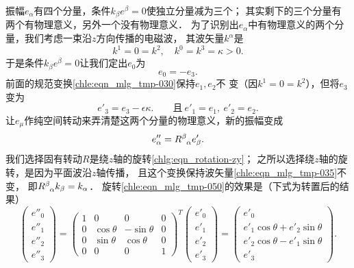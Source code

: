 振幅$e_\alpha$有四个分量，条件$k_\beta e^\beta =0$使独立分量减为三个；
其实剩下的三个分量有两个有物理意义，另外一个没有物理意义．
为了识别出$e_\alpha$中有物理意义的两个分量，我们考虑一束沿$z$方向传播的电磁波，
其波矢量$k^\alpha$是
\begin{equation}\label{chle:eqn_mlg_tmp-035}
    k^1 = 0= k^2 , \quad k^0=k^3=\kappa >0.
\end{equation}
于是条件$k_\beta e^\beta =0$让我们定出$e_0$为
\begin{equation}\label{chle:eqn_mlg_tmp-040}
    e_0 = - e_3.
\end{equation}
前面的规范变换\eqref{chle:eqn_mlg_tmp-030}保持$e_1,e_2$不
变（因$k^1 = 0= k^2$），但将$e_3$变为
\begin{equation}\label{chle:eqn_mlg_tmp-045}
    e'_3 =  e_3 - \epsilon \kappa. \qquad
     \text{且} \  e'_1 =  e_1, \  e'_2 =  e_2 .
\end{equation}
让$e_\mu$作纯空间转动来弄清楚这两个分量的物理意义，新的振幅变成
\begin{equation}\label{chle:eqn_mlg_tmp-050}
    e''_\alpha =  R^{\beta}_{\hphantom{\beta} \alpha} e'_\beta.
\end{equation}
我们选择固有转动$R$是绕$z$轴的旋转\eqref{chlg:eqn_rotation-zy}；
之所以选择绕$z$轴的旋转，是因为平面波沿$z$轴传播，
且这个变换保持波矢量\eqref{chle:eqn_mlg_tmp-035}不变，
即$R^{\beta}_{\hphantom{\beta} \alpha} k_\beta =k_\alpha$．
旋转\eqref{chle:eqn_mlg_tmp-050}的效果是（下式为转置后的结果）
\begin{equation}\label{chle:eqn_mlg_tmp-053}
    \begin{pmatrix}e''_0\\e''_1\\e''_2\\e''_3 \end{pmatrix}=
    \begin{pmatrix}
        1&0&0&0 \\
        0&  {\cos \theta }&{ - \sin \theta }&0 \\
        0&  {\sin \theta }&{\cos \theta }&0 \\
        0&0&0&1
    \end{pmatrix}^T
    \begin{pmatrix}e'_0\\e'_1\\e'_2\\e'_3 \end{pmatrix}
    =\begin{pmatrix}
        e'_0\\
        e'_1 \cos\theta + e'_2 \sin\theta \\
        e'_2 \cos\theta - e'_1 \sin\theta  \\
        e'_3
    \end{pmatrix}.
\end{equation} %
